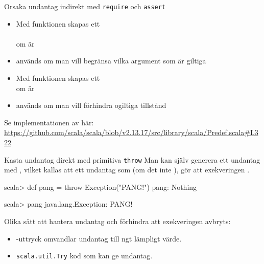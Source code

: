 \begin{Slide}{Orsaka undantag indirekt med \texttt{require} och \texttt{assert}}

\begin{itemize}\SlideFontSmall
  \item Med funktionen  skapas ett \\ \\ om  är 
  \item {} används om man vill begränsa vilka argument som är giltiga
  \item Med funktionen  skapas ett  \\ om  är  
  \item {} används om man vill förhindra ogiltiga tillstånd
\end{itemize}
{
  \ifkompendium\else
  \vfill\SlideFontTiny
  \fi
  Se implementationen av  här:\\
\url{https://github.com/scala/scala/blob/v2.13.17/src/library/scala/Predef.scala#L322}
}
\end{Slide}

\begin{Slide}{Kasta undantag direkt med primitiva \texttt{throw}}\SlideFontSmall
Man kan själv generera ett undantag med , vilket kallas att  ett undantag som (om det inte ), gör att exekveringen .


\begin{REPL}
scala> def pang = throw Exception("PANG!")
pang: Nothing

scala> pang
java.lang.Exception: PANG!

\end{REPL}
\pause
Olika sätt att hantera undantag och förhindra att exekveringen avbryts:
\begin{itemize}
\item {}-uttryck omvandlar undantag till ngt lämpligt värde.

\item \texttt{scala.util.Try}  kod som kan ge undantag.  %
\end{itemize}
\end{Slide}


